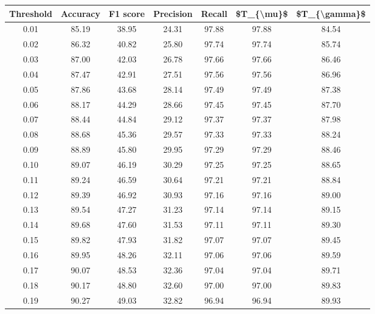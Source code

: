 \begin{tabular}{|c|c|c|c|c|c|c|}
\hline
 Threshold &  Accuracy &  F1 score &  Precision &  Recall &  \$T\_\{\textbackslash mu\}\$ &  \$T\_\{\textbackslash gamma\}\$ \\
\hline
      0.01 &     85.19 &     38.95 &      24.31 &   97.88 &      97.88 &         84.54 \\
      0.02 &     86.32 &     40.82 &      25.80 &   97.74 &      97.74 &         85.74 \\
      0.03 &     87.00 &     42.03 &      26.78 &   97.66 &      97.66 &         86.46 \\
      0.04 &     87.47 &     42.91 &      27.51 &   97.56 &      97.56 &         86.96 \\
      0.05 &     87.86 &     43.68 &      28.14 &   97.49 &      97.49 &         87.38 \\
      0.06 &     88.17 &     44.29 &      28.66 &   97.45 &      97.45 &         87.70 \\
      0.07 &     88.44 &     44.84 &      29.12 &   97.37 &      97.37 &         87.98 \\
      0.08 &     88.68 &     45.36 &      29.57 &   97.33 &      97.33 &         88.24 \\
      0.09 &     88.89 &     45.80 &      29.95 &   97.29 &      97.29 &         88.46 \\
      0.10 &     89.07 &     46.19 &      30.29 &   97.25 &      97.25 &         88.65 \\
      0.11 &     89.24 &     46.59 &      30.64 &   97.21 &      97.21 &         88.84 \\
      0.12 &     89.39 &     46.92 &      30.93 &   97.16 &      97.16 &         89.00 \\
      0.13 &     89.54 &     47.27 &      31.23 &   97.14 &      97.14 &         89.15 \\
      0.14 &     89.68 &     47.60 &      31.53 &   97.11 &      97.11 &         89.30 \\
      0.15 &     89.82 &     47.93 &      31.82 &   97.07 &      97.07 &         89.45 \\
      0.16 &     89.95 &     48.26 &      32.11 &   97.06 &      97.06 &         89.59 \\
      0.17 &     90.07 &     48.53 &      32.36 &   97.04 &      97.04 &         89.71 \\
      0.18 &     90.17 &     48.80 &      32.60 &   97.00 &      97.00 &         89.83 \\
      0.19 &     90.27 &     49.03 &      32.82 &   96.94 &      96.94 &         89.93 \\

\end{tabular}
